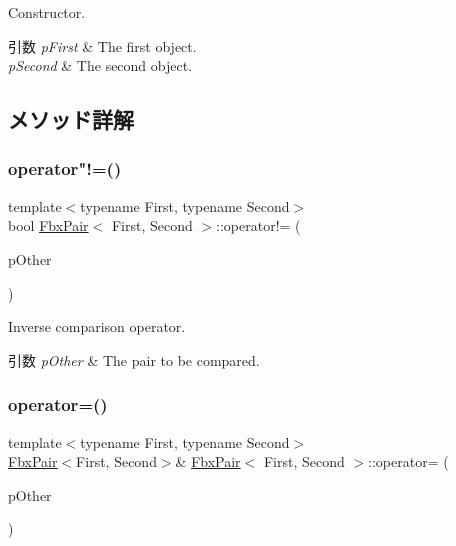 Constructor. 
\begin{DoxyParams}{引数}
{\em p\+First} & The first object. \\
\hline
{\em p\+Second} & The second object. \\
\hline
\end{DoxyParams}


\subsection{メソッド詳解}
\mbox{\label{class_fbx_pair_a6a08f9caa08c3bdd093951eeeaed31bf}} 
\subsubsection{\texorpdfstring{operator"!=()}{operator!=()}}
{\footnotesize\ttfamily template$<$typename First, typename Second$>$ \\
bool \hyperlink{class_fbx_pair}{Fbx\+Pair}$<$ First, Second $>$\+::operator!= (\begin{DoxyParamCaption}\item[{const \hyperlink{class_fbx_pair}{Fbx\+Pair}$<$ First, Second $>$ \&}]{p\+Other }\end{DoxyParamCaption})}

Inverse comparison operator. 
\begin{DoxyParams}{引数}
{\em p\+Other} & The pair to be compared. \\
\hline
\end{DoxyParams}
\mbox{\label{class_fbx_pair_ab645f08678477ba9b74c08ff5d61bf52}} 
\subsubsection{\texorpdfstring{operator=()}{operator=()}}
{\footnotesize\ttfamily template$<$typename First, typename Second$>$ \\
\hyperlink{class_fbx_pair}{Fbx\+Pair}$<$First, Second$>$\& \hyperlink{class_fbx_pair}{Fbx\+Pair}$<$ First, Second $>$\+::operator= (\begin{DoxyParamCaption}\item[{const \hyperlink{class_fbx_pair}{Fbx\+Pair}$<$ First, Second $>$ \&}]{p\+Other }\end{DoxyParamCaption})}

